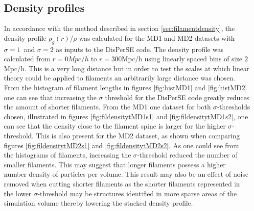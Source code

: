 \subsection{Density profiles}\label{sec:filamentdensityres}
In accordance with the method described in section \ref{sec:filamentdensity}, the density profile $\rho_g(r)/\rho$ was calculated for the MD1 and MD2 datasets with $\sigma=1$ and $\sigma=2$ as inputs to the DisPerSE code. The density profile was calculated from $r=0Mpc/h$ to $r=300$Mpc/h using linearly spaced bins of size $2$Mpc/h. This is a very long distance but in order to test the scales at which linear theory could be applied to filaments an arbitrarily large distance was chosen. From the histogram of filament lengths in figures \ref{fig:histMD1} and \ref{fig:histMD2} one can see that increasing the $\sigma$ threshold for the DisPerSE code greatly reduces the amount of shorter filaments. From the MD1 one dataset for both $\sigma$-thresholds chosen, illustrated in figures \ref{fig:fildensitytMD1s1} and \ref{fig:fildensitytMD1s2}, one can see that the density close to the filament spine is larger for the higher $\sigma$-threshold. This is also present for the MD2 dataset, as shown when comparing figures \ref{fig:fildensitytMD2s1} and \ref{fig:fildensitytMD2s2}. As one could see from the histograms of filaments, increasing the $\sigma$-threshold reduced the number of smaller filaments. This may suggest that longer filaments possess a higher number density of particles per volume. This result may also be an effect of noise removed when cutting shorter filaments as the shorter filaments represented in the lower $\sigma$-threshold may be structures identified in more sparse areas of the simulation volume thereby lowering the stacked density profile.\\\indent
